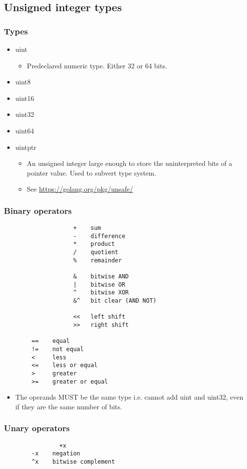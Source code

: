 \documentclass{article}
\begin{document}
	\subsection{Unsigned integer types}	
		\subsubsection{Types}
		\begin{itemize}
    			\item uint
				\begin{itemize}
					\item Predeclared numeric type. Either 32 or 64 bits. 
				\end{itemize}
    			\item uint8
   	 		\item uint16
    			\item uint32
    			\item uint64
    			\item uintptr
				\begin{itemize}
					\item An unsigned integer large enough to store the uninterpreted bits of a pointer value. Used to subvert type system. 
					\item See \url{https://golang.org/pkg/unsafe/}
				\end{itemize}
		\end{itemize}
		\subsubsection{Binary operators}
			\begin{verbatim}
				    +    sum  
				    -    difference   
				    *    product       
				    /    quotient     
				    %    remainder  

				    &    bitwise AND    
				    |    bitwise OR    
				    ^    bitwise XOR   
				    &^   bit clear (AND NOT) 

				    <<   left shift
				    >>   right shift
				    
	    ==    equal
	    !=    not equal
	    <     less
	    <=    less or equal
	    >     greater
	    >=    greater or equal
			\end{verbatim}	
			\begin{itemize}
				\item The operands MUST be the same type i.e. cannot add uint and uint32, even if they are the same number of bits.  
			\end{itemize}
		\subsubsection{Unary operators}
			\begin{verbatim}
		   		+x                     
	    -x    negation         
	    ^x    bitwise complement 
			\end{verbatim}
\end{document}
